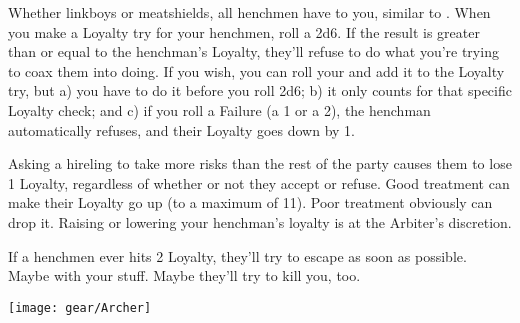 

Whether linkboys or meatshields, all henchmen have  to you, similar to .  When you make a Loyalty try for your henchmen, roll a 2d6. If the result is greater than or equal to the henchman's Loyalty, they'll refuse to do what you're trying to coax them into doing.  If you wish, you can roll your \PRE and add it to the Loyalty try, but a) you have to do it before you roll 2d6; b) it only counts for that specific Loyalty check;  and c) if you roll a Failure (a 1 or a 2), the henchman automatically refuses, and their Loyalty goes down by 1.

    Asking a hireling to take more risks than the rest of the party causes them to lose 1 Loyalty, regardless of whether or not they accept or refuse. Good treatment can make their Loyalty go up (to a maximum of 11).  Poor treatment obviously can drop it.  Raising or lowering your henchman's loyalty is at the Arbiter's discretion.


    If a henchmen ever hits 2 Loyalty, they'll try to escape as soon as possible.  Maybe with your stuff.  Maybe they'll try to kill you, too.

\begin{center}
\texttt{[image: gear/Archer]}
\end{center}

\cbreak





